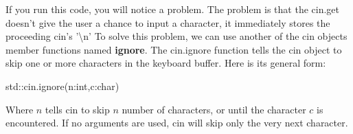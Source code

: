\documentclass{report}
\begin{document}
    \bigbreak \noindent 
    If you run this code, you will notice a problem. The problem is that the cin.get doesn't give the user a chance to input a character, it immediately stores the proceeding cin's '\textbackslash n'
    \bigbreak \noindent 
    To solve this problem, we can use another of the cin objects member functions named \textbf{ignore}. The cin.ignore function tells the cin object to skip one or more characters in the keyboard buffer. Here is its general form:
    \smallbreak \noindent
    
    \begin{cppcode}
            std::cin.ignore(n:int,c:char)
    \end{cppcode}
    
    \bigbreak \noindent 
    Where $n$ tells cin to skip $n$ number of characters, or until the character $c$ is encountered. If no arguments are used, cin will skip only the very next character.





    \pagebreak \bigbreak \noindent 
\end{document}
